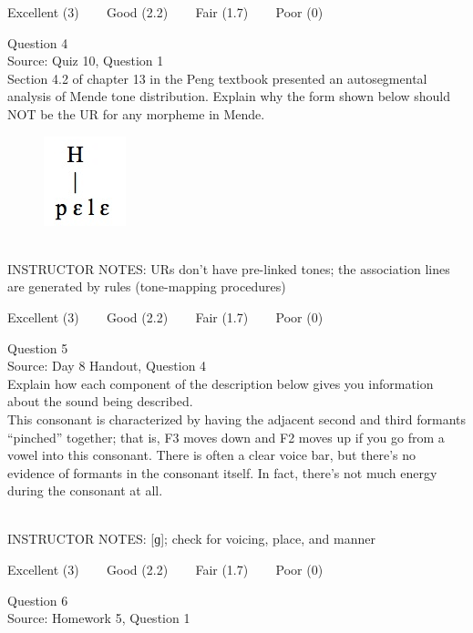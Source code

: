 \documentclass[12pt]{article}
\begin{document}
\vfill
Excellent (3) ~~~ Good (2.2) ~~~ Fair (1.7) ~~~ Poor (0)
\newpage

{\large Question 4}\\

Source: Quiz 10, Question 1\\

Section 4.2 of chapter 13 in the Peng textbook presented an autosegmental analysis of Mende tone distribution. Explain why the form shown below should NOT be the UR for any morpheme in Mende.\\

\begin{figure}[H]
\includegraphics{../images/mende_house_a.png}
\end{figure}

~\\
INSTRUCTOR NOTES: URs don't have pre-linked tones; the association lines are generated by rules (tone-mapping procedures)


\vfill
Excellent (3) ~~~ Good (2.2) ~~~ Fair (1.7) ~~~ Poor (0)
\newpage

{\large Question 5}\\

Source: Day 8 Handout, Question 4\\

Explain how each component of the description below gives you information about the sound being described.\\

This consonant is characterized by having the adjacent second and third formants ``pinched'' together; that is, F3 moves down and F2 moves up if you go from a vowel into this consonant. There is often a clear voice bar, but there’s no evidence of formants in the consonant itself. In fact, there’s not much energy during the consonant at all.


~\\
INSTRUCTOR NOTES: [ɡ]; check for voicing, place, and manner


\vfill
Excellent (3) ~~~ Good (2.2) ~~~ Fair (1.7) ~~~ Poor (0)
\newpage

{\large Question 6}\\

Source: Homework 5, Question 1\\
\end{document}
